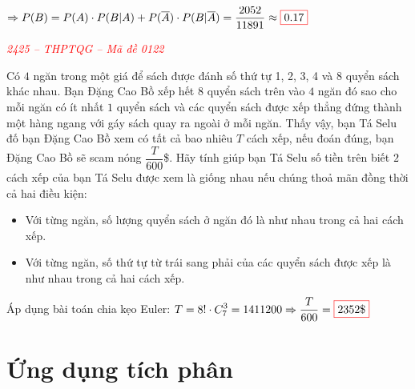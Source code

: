 \documentclass[twoside,final]{hcmut-report}
\newcommand{\exercise}[1]{\begin{exercisebox}#1\end{exercisebox}}
\newcommand{\result}[1]{\fcolorbox{red}{white}{#1}}
\begin{document}
$\Rightarrow P(B) = P(A)\cdot P(B|A) + P(\overline{A})\cdot P(B|\overline{A}) = \dfrac{2052}{11891} \approx \result{$0.17$}$
\exercise{
    \textcolor{red}{\textit{2425 -- THPTQG -- Mã đề 0122}}

    Có $4$ ngăn trong một giá để sách được đánh số thứ tự 1, 2, 3, 4 và $8$ quyển sách khác nhau. Bạn Đặng Cao Bồ xếp hết $8$ quyển sách trên vào $4$ ngăn đó sao cho mỗi ngăn có ít nhất $1$ quyển sách và các quyển sách được xếp thẳng đứng thành một hàng ngang với gáy sách quay ra ngoài ở mỗi ngăn. Thấy vậy, bạn Tá Selu đố bạn Đặng Cao Bồ xem có tất cả bao nhiêu $T$ cách xếp, nếu đoán đúng, bạn Đặng Cao Bồ sẽ scam nóng $\dfrac{T}{600}$\$. Hãy tính giúp bạn Tá Selu số tiền trên biết $2$ cách xếp của bạn Tá Selu được xem là giống nhau nếu chúng thoả mãn đồng thời cả hai điều kiện:
    \begin{itemize}[itemsep=0pt, topsep=0pt, parsep=0pt,label=--]
        \item Với từng ngăn, số lượng quyển sách ở ngăn đó là như nhau trong cả hai cách xếp.
        \item Với từng ngăn, số thứ tự từ trái sang phải của các quyển sách được xếp là như nhau trong cả hai cách xếp.
    \end{itemize}
}
Áp dụng bài toán chia kẹo Euler: $T = 8!\cdot\displaystyle C^3_7 = 1411200 \Rightarrow \dfrac{T}{600} = \result{$2352\$$}$
\newpage\section{Ứng dụng tích phân}
\end{document}
